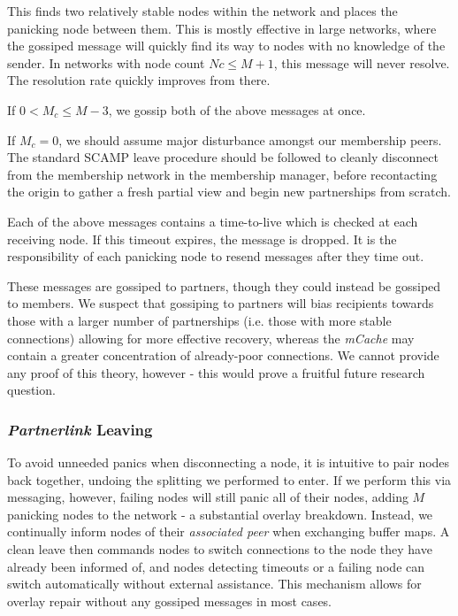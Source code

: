 \documentclass[12pt,a4paper]{article}
\begin{document}
This finds two relatively stable nodes within the network and places the panicking node between them. This is mostly effective in large networks, where the gossiped message will quickly find its way to nodes with no knowledge of the sender. In networks with node count \(Nc \leq M + 1\), this message will never resolve. The resolution rate quickly improves from there.

If \(0 < M_c \leq M - 3\), we gossip both of the above messages at once.

If \(M_c = 0\), we should assume major disturbance amongst our membership peers. The standard SCAMP leave procedure should be followed to cleanly disconnect from the membership network in the membership manager, before recontacting the origin to gather a fresh partial view and begin new partnerships from scratch.

Each of the above messages contains a time-to-live which is checked at each receiving node. If this timeout expires, the message is dropped. It is the responsibility of each panicking node to resend messages after they time out.

These messages are gossiped to partners, though they could instead be gossiped to members. We suspect that gossiping to partners will bias recipients towards those with a larger number of partnerships (i.e. those with more stable connections) allowing for more effective recovery, whereas the \textit{mCache} may contain a greater concentration of already-poor connections. We cannot provide any proof of this theory, however - this would prove a fruitful future research question.


\subsubsection{\textit{Partnerlink} Leaving}
To avoid unneeded panics when disconnecting a node, it is intuitive to pair nodes back together, undoing the splitting we performed to enter. If we perform this via messaging, however, failing nodes will still panic all of their nodes, adding \(M\) panicking nodes to the network - a substantial overlay breakdown. Instead, we continually inform nodes of their \textit{associated peer} when exchanging buffer maps. A clean leave then commands nodes to switch connections to the node they have already been informed of, and nodes detecting timeouts or a failing node can switch automatically without external assistance. This mechanism allows for overlay repair without any gossiped messages in most cases.
\end{document}
